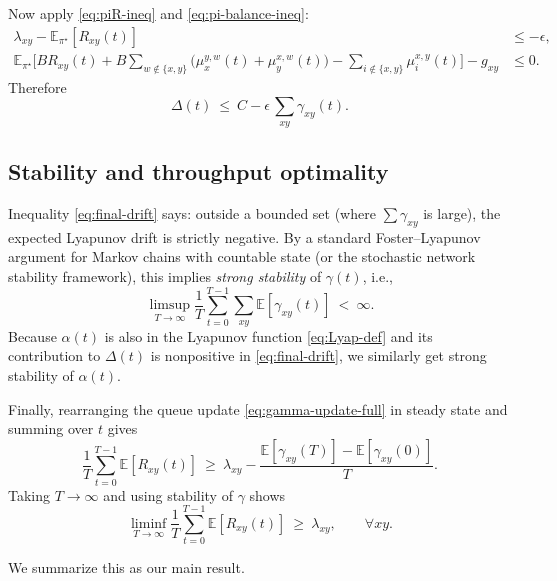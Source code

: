 \documentclass[11pt]{article}
\newcommand{\E}{\mathbb{E}}
\begin{document}
Now apply \eqref{eq:piR-ineq} and \eqref{eq:pi-balance-ineq}:
\begin{align*}
\lambda_{xy} - \E_{\pi^\star}[R_{xy}(t)]
&\le -\epsilon,\\
\E_{\pi^\star}\!\Big[
B R_{xy}(t)
+ B\sum_{w\notin\{x,y\}}\big(\mu_x^{y,w}(t)+\mu_y^{x,w}(t)\big)
- \sum_{i\notin\{x,y\}}\mu_i^{x,y}(t)
\Big]
- g_{xy}
&\le 0.
\end{align*}
Therefore
\begin{equation}
\Delta(t)
\ \le\
C
-\epsilon\,\sum_{xy}\gamma_{xy}(t).
\label{eq:final-drift}
\end{equation}

\subsection{Stability and throughput optimality}

Inequality \eqref{eq:final-drift} says: outside a bounded set (where $\sum\gamma_{xy}$ is large), the expected Lyapunov drift is strictly negative. By a standard Foster--Lyapunov argument for Markov chains with countable state (or the stochastic network stability framework), this implies \emph{strong stability} of $\gamma(t)$, i.e.,
\[
\limsup_{T\to\infty}\frac{1}{T}\sum_{t=0}^{T-1}\sum_{xy}\E[\gamma_{xy}(t)]
\ <\ \infty.
\]
Because $\alpha(t)$ is also in the Lyapunov function \eqref{eq:Lyap-def} and its contribution to $\Delta(t)$ is nonpositive in \eqref{eq:final-drift}, we similarly get strong stability of $\alpha(t)$.

Finally, rearranging the queue update \eqref{eq:gamma-update-full} in steady state and summing over $t$ gives
\[
\frac{1}{T}\sum_{t=0}^{T-1}\E[R_{xy}(t)]
\ \ge\
\lambda_{xy}
- \frac{\E[\gamma_{xy}(T)]-\E[\gamma_{xy}(0)]}{T}.
\]
Taking $T\to\infty$ and using stability of $\gamma$ shows
\[
\liminf_{T\to\infty}
\frac{1}{T}\sum_{t=0}^{T-1}\E[R_{xy}(t)]
\ \ge\ \lambda_{xy},
\qquad \forall xy.
\]

We summarize this as our main result.
\end{document}
